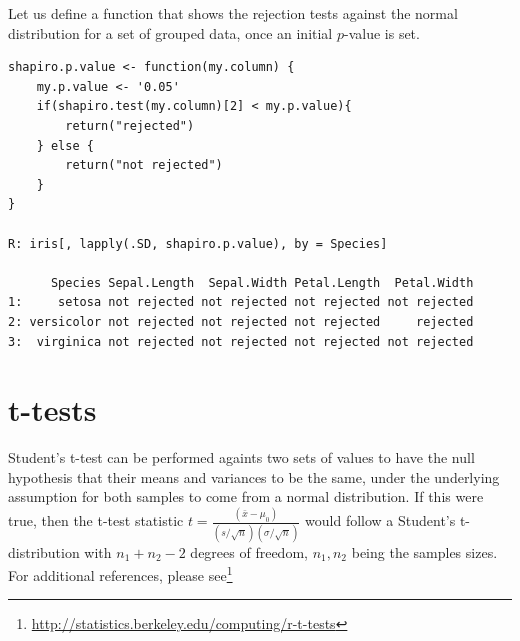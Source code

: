 Let us define a function that shows the rejection tests 
against the normal distribution for a set of 
grouped data, once an initial $p$-value is set.
\begin{verbatim}
shapiro.p.value <- function(my.column) {
    my.p.value <- '0.05'
    if(shapiro.test(my.column)[2] < my.p.value){
        return("rejected")
    } else {
        return("not rejected")
    }
} 
 
R: iris[, lapply(.SD, shapiro.p.value), by = Species]

      Species Sepal.Length  Sepal.Width Petal.Length  Petal.Width
1:     setosa not rejected not rejected not rejected not rejected
2: versicolor not rejected not rejected not rejected     rejected
3:  virginica not rejected not rejected not rejected not rejected
\end{verbatim}

\section{t-tests}
Student's t-test can be performed againts two 
sets of values to have the null hypothesis that their
means and variances to be the same, under the underlying 
assumption for both samples to come from a normal distribution.
If this were true, then the t-test statistic  
$t=\frac{(\bar{x}-\mu_0)}{(s/\sqrt{n})(\sigma/\sqrt{n})}$ would follow
a Student's t-distribution with $n_1 + n_2 -2$ degrees
of freedom, $n_1, n_2$ being the samples sizes.
For additional references, please see\footnote{ 
\url{http://statistics.berkeley.edu/computing/r-t-tests}
}
\medskip 

